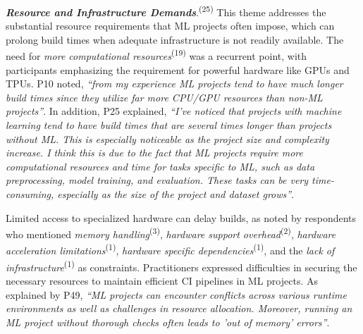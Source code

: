 \textit{\textbf{Resource and Infrastructure Demands}}.\textsuperscript{(25)} This theme addresses the substantial resource requirements that ML projects often impose, which can prolong build times when adequate infrastructure is not readily available. The need for \textit{more computational resources}\textsuperscript{(19)} was a recurrent point, with participants emphasizing the requirement for powerful hardware like GPUs and TPUs. P10 noted, \textit{``from my experience ML projects tend to have much longer build times since they utilize far more CPU/GPU resources than non-ML projects''}. In addition, P25 explained, \textit{``I've noticed that projects with machine learning tend to have build times that are several times longer than projects without ML. This is especially noticeable as the project size and complexity increase. I think this is due to the fact that ML projects require more computational resources and time for tasks specific to ML, such as data preprocessing, model training, and evaluation. These tasks can be very time-consuming, especially as the size of the project and dataset grows''}. 

Limited access to specialized hardware can delay builds, as noted by respondents who mentioned \textit{memory handling}\textsuperscript{(3)}, \textit{hardware support overhead}\textsuperscript{(2)}, \textit{hardware acceleration limitations}\textsuperscript{(1)}, \textit{hardware specific dependencies}\textsuperscript{(1)}, and the \textit{lack of infrastructure}\textsuperscript{(1)} as constraints. Practitioners expressed difficulties in securing the necessary resources to maintain efficient CI pipelines in ML projects. As explained by P49, \textit{``ML projects can encounter conflicts across various runtime environments as well as challenges in resource allocation. Moreover, running an ML project without thorough checks often leads to 'out of memory' errors''}.


